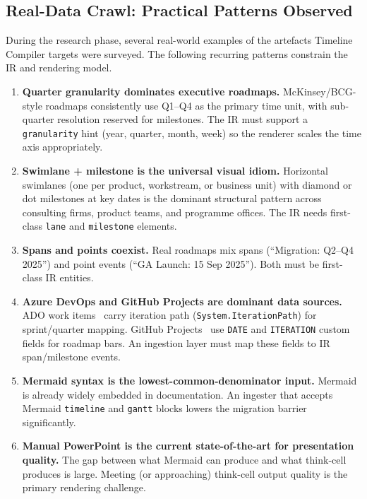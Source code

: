 \subsection{Real-Data Crawl: Practical Patterns Observed}
\label{sec:comparison-patterns}

During the research phase, several real-world examples of the artefacts
Timeline Compiler targets were surveyed.
The following recurring patterns constrain the IR and rendering model.

\begin{enumerate}
  \item \textbf{Quarter granularity dominates executive roadmaps.}
        McKinsey/BCG-style roadmaps consistently use Q1--Q4 as the primary
        time unit, with sub-quarter resolution reserved for milestones.
        The IR must support a \texttt{granularity} hint (year, quarter, month,
        week) so the renderer scales the time axis appropriately.

  \item \textbf{Swimlane + milestone is the universal visual idiom.}
        Horizontal swimlanes (one per product, workstream, or business unit)
        with diamond or dot milestones at key dates is the dominant
        structural pattern across consulting firms, product teams, and
        programme offices.
        The IR needs first-class \texttt{lane} and \texttt{milestone} elements.

  \item \textbf{Spans and points coexist.}
        Real roadmaps mix spans (``Migration: Q2--Q4 2025'') and point events
        (``GA Launch: 15 Sep 2025'').
        Both must be first-class IR entities.

  \item \textbf{Azure DevOps and GitHub Projects are dominant data sources.}
        ADO work items~\cite{ado-workitems} carry iteration path
        (\texttt{System.IterationPath}) for sprint/quarter mapping.
        GitHub Projects~\cite{github-projects} use \texttt{DATE} and
        \texttt{ITERATION} custom fields for roadmap bars.
        An ingestion layer must map these fields to IR span/milestone events.

  \item \textbf{Mermaid syntax is the lowest-common-denominator input.}
        Mermaid is already widely embedded in documentation.
        An ingester that accepts Mermaid \texttt{timeline} and \texttt{gantt}
        blocks lowers the migration barrier significantly.

  \item \textbf{Manual PowerPoint is the current state-of-the-art for
        presentation quality.}
        The gap between what Mermaid can produce and what think-cell
        produces is large.
        Meeting (or approaching) think-cell output quality is the primary
        rendering challenge.
\end{enumerate}

